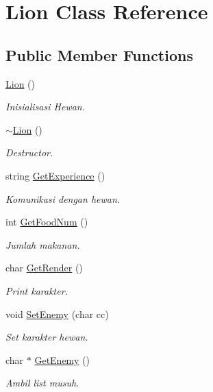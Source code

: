 \hypertarget{class_lion}{}\section{Lion Class Reference}
\label{class_lion}
\subsection*{Public Member Functions}
\begin{DoxyCompactItemize}
\item 
\hyperlink{class_lion_a582202364024a9ce10e57f47c872dbc2}{Lion} ()\hypertarget{class_lion_a582202364024a9ce10e57f47c872dbc2}{}\label{class_lion_a582202364024a9ce10e57f47c872dbc2}

\begin{DoxyCompactList}\small\item\em Inisialisasi Hewan. \end{DoxyCompactList}\item 
\hyperlink{class_lion_add3b70c968c9382d00f25f5d148e590f}{$\sim$\+Lion} ()\hypertarget{class_lion_add3b70c968c9382d00f25f5d148e590f}{}\label{class_lion_add3b70c968c9382d00f25f5d148e590f}

\begin{DoxyCompactList}\small\item\em Destructor. \end{DoxyCompactList}\item 
string \hyperlink{class_lion_afa35a6404cbe361b3b194b0108e509c3}{Get\+Experience} ()\hypertarget{class_lion_afa35a6404cbe361b3b194b0108e509c3}{}\label{class_lion_afa35a6404cbe361b3b194b0108e509c3}

\begin{DoxyCompactList}\small\item\em Komunikasi dengan hewan. \end{DoxyCompactList}\item 
int \hyperlink{class_lion_a81634783736b25b858c06d9c5e8d2e5c}{Get\+Food\+Num} ()
\begin{DoxyCompactList}\small\item\em Jumlah makanan. \end{DoxyCompactList}\item 
char \hyperlink{class_lion_ae649b47525e05cc575de59dcc273caf7}{Get\+Render} ()
\begin{DoxyCompactList}\small\item\em Print karakter. \end{DoxyCompactList}\item 
void \hyperlink{class_lion_a0f947ecb0b50e4b503dde745baaff8cc}{Set\+Enemy} (char cc)
\begin{DoxyCompactList}\small\item\em Set karakter hewan. \end{DoxyCompactList}\item 
char $\ast$ \hyperlink{class_lion_abc59a245181f557f6719fce7df1580cc}{Get\+Enemy} ()
\begin{DoxyCompactList}\small\item\em Ambil list musuh. \end{DoxyCompactList}\end{DoxyCompactItemize}
